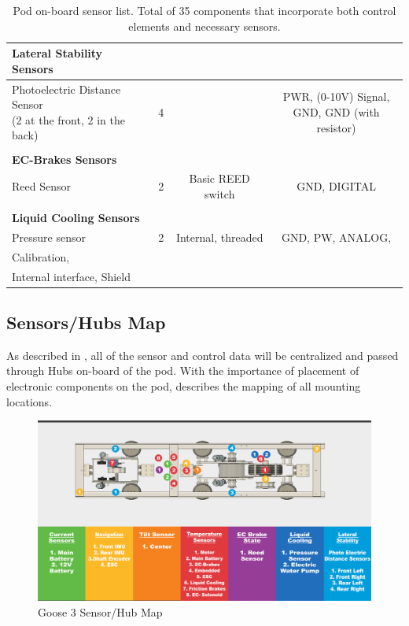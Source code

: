 \documentclass[main.tex]{subfiles}
\begin{document}
\begin{table}
\begin{tabularx}{\linewidth}{@{}lccc@{}}
	\textbf{Lateral Stability Sensors} & & & \\ \midrule
    \makecell{Photoelectric Distance Sensor \\ (2 at the front, 2 in the back)} & 4 &  & \makecell{PWR, (0-10V) Signal, \\ GND, GND (with resistor)} \\
    
    & & & \\
	\textbf{EC-Brakes Sensors} & & & \\ \midrule
    Reed Sensor & 2 & Basic REED switch & GND, DIGITAL \\
    
    & & & \\
    \textbf{Liquid Cooling Sensors} & & & \\ \midrule
    Pressure sensor & 2 & Internal, threaded & GND, PW, ANALOG, \\ Calibration, \\ Internal interface, Shield  \\\bottomrule
    \end{tabularx}
    \caption{Pod on-board sensor list. Total of 35 components that incorporate both control elements and necessary sensors.}
    \label{tab:pod-sensor-list}
\end{table}

\subsection{Sensors/Hubs Map}
As described in , all of the sensor and control data will be centralized and passed through Hubs on-board of the pod. With the importance of placement of electronic components on the pod,  describes the mapping of all mounting locations.

  \begin{figure}
        \centering
        \includegraphics[width=\textwidth]{images/sensor-map.jpg}
        \caption{Goose 3 Sensor/Hub Map}
        \label{fig:sensor-map}
    \end{figure}
\end{document}

